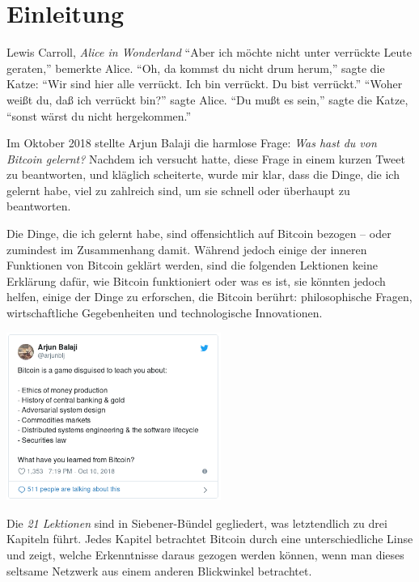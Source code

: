 \chapter*{Einleitung}
\label{ch:introduction}

\begin{chapquote}{Lewis Carroll, \textit{Alice in Wonderland}}
\enquote{Aber ich möchte nicht unter verrückte Leute geraten,} bemerkte Alice.
\enquote{Oh, da kommst du nicht drum herum,} sagte die Katze: \enquote{Wir sind
hier alle verrückt. Ich bin verrückt. Du bist verrückt.} \enquote{Woher weißt
du, daß ich verrückt bin?} sagte Alice. \enquote{Du mußt es sein,} sagte die
Katze, \enquote{sonst wärst du nicht hergekommen.}
\end{chapquote}

Im Oktober 2018 stellte Arjun Balaji die harmlose Frage: \textit{Was hast du von
Bitcoin gelernt?} Nachdem ich versucht hatte, diese Frage in einem kurzen Tweet
zu beantworten, und kläglich scheiterte, wurde mir klar, dass die Dinge, die ich
gelernt habe, viel zu zahlreich sind, um sie schnell oder überhaupt zu
beantworten.

Die Dinge, die ich gelernt habe, sind offensichtlich auf Bitcoin bezogen – oder
zumindest im Zusammenhang damit. Während jedoch einige der inneren Funktionen
von Bitcoin geklärt werden, sind die folgenden Lektionen keine Erklärung dafür,
wie Bitcoin funktioniert oder was es ist, sie könnten jedoch helfen, einige der
Dinge zu erforschen, die Bitcoin berührt: philosophische Fragen, wirtschaftliche
Gegebenheiten und technologische Innovationen.

\begin{center}
  \includegraphics[width=7cm]{assets/images/the-tweet.png}
\end{center}

Die \textit{21 Lektionen} sind in Siebener-Bündel gegliedert, was letztendlich
zu drei Kapiteln führt. Jedes Kapitel betrachtet Bitcoin durch eine
unterschiedliche Linse und zeigt, welche Erkenntnisse daraus gezogen werden
können, wenn man dieses seltsame Netzwerk aus einem anderen Blickwinkel
betrachtet.

